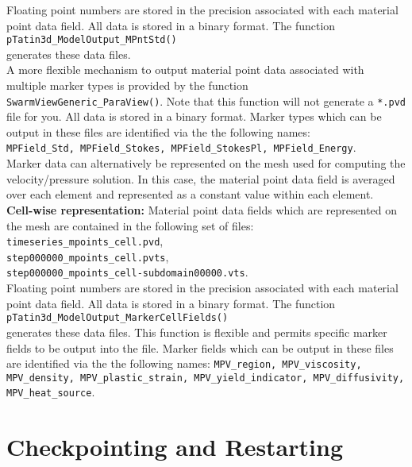\documentclass[paper=a4, fontsize=10pt,twoside]{scrartcl}
\newcommand{\unix}[1]{\texttt{\footnotesize #1}}
\begin{document}
Floating point numbers are stored in the precision associated with each material point data field. All data is stored in a binary format. The function \\
\unix{pTatin3d\_ModelOutput\_MPntStd()} \\
generates these data files.
\\[8pt]
A more flexible mechanism to output material point data associated with multiple marker types is provided by the function \unix{SwarmViewGeneric\_ParaView()}. Note that this function will not generate a \texttt{*.pvd} file for you.  All data is stored in a binary format. Marker types which can be output in these files are identified via the the following names: \\
\unix{MPField\_Std, MPField\_Stokes, MPField\_StokesPl, MPField\_Energy}.
\\[8pt]
Marker data can alternatively be represented on the mesh used for computing the velocity/pressure solution.
In this case, the material point data field is averaged over each element and represented as a constant value within each element.
\\[8pt]
{\bf Cell-wise representation:} Material point data fields which are represented on the mesh are contained in the following set of files:\\
\unix{timeseries\_mpoints\_cell.pvd}, \\
\unix{step000000\_mpoints\_cell.pvts}, \\
\unix{step000000\_mpoints\_cell-subdomain00000.vts}. \\
Floating point numbers are stored in the precision associated with each material point data field. All data is stored in a binary format.
The function \\
	\unix{pTatin3d\_ModelOutput\_MarkerCellFields()} \\
generates these data files. This function is flexible and permits specific marker fields to be output into the file. Marker fields which can be output in these files are identified via the the following names:
\unix{MPV\_region, MPV\_viscosity, MPV\_density, MPV\_plastic\_strain, MPV\_yield\_indicator, MPV\_diffusivity, MPV\_heat\_source}.

\section{Checkpointing and Restarting} \label{sec:checkpoint}
\end{document}
